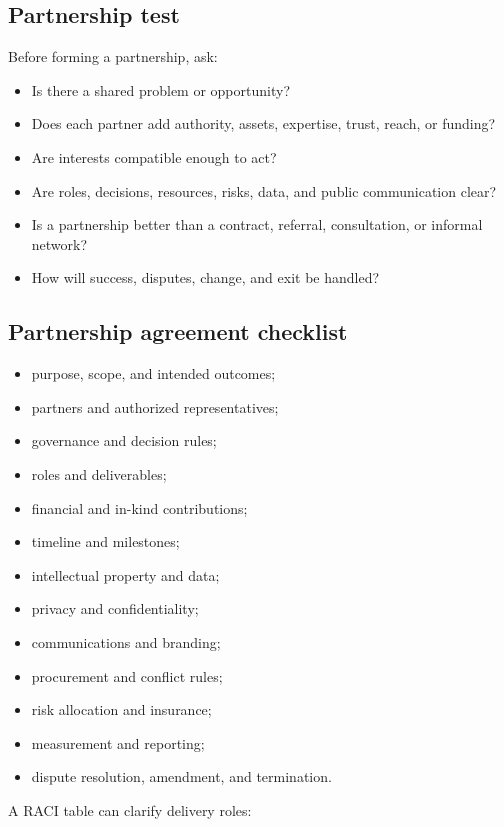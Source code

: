 \documentclass[11pt,letterpaper,oneside,openany]{book}
\begin{document}
\subsection[Partnership test]{Partnership test}
Before forming a partnership, ask:


\begin{itemize}
\item Is there a shared problem or opportunity?
\item Does each partner add authority, assets, expertise, trust, reach, or funding?
\item Are interests compatible enough to act?
\item Are roles, decisions, resources, risks, data, and public communication clear?
\item Is a partnership better than a contract, referral, consultation, or informal network?
\item How will success, disputes, change, and exit be handled?
\end{itemize}


\subsection[Partnership agreement checklist]{Partnership agreement checklist}
\begin{itemize}
\item purpose, scope, and intended outcomes;
\item partners and authorized representatives;
\item governance and decision rules;
\item roles and deliverables;
\item financial and in-kind contributions;
\item timeline and milestones;
\item intellectual property and data;
\item privacy and confidentiality;
\item communications and branding;
\item procurement and conflict rules;
\item risk allocation and insurance;
\item measurement and reporting;
\item dispute resolution, amendment, and termination.
\end{itemize}


A RACI table can clarify delivery roles:
\end{document}
